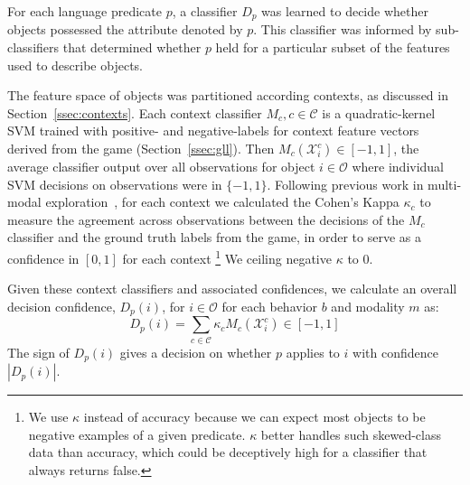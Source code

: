 For each language predicate $p$, a classifier $D_p$ was learned to decide whether objects possessed the attribute denoted by $p$.
This classifier was informed by sub-classifiers that determined whether $p$ held for a particular subset of the features used to describe objects.

The feature space of objects was partitioned according contexts, as discussed in Section~\ref{ssec:contexts}.
Each context classifier $M_{c}, c\in\mathcal{C}$ is a quadratic-kernel SVM trained with positive- and negative-labels for context feature vectors derived from the \ispy game (Section~\ref{ssec:gll}).
Then $M_{c}(\mathcal{X}_i^c)\in [-1,1]$, the average classifier output over all observations for object $i\in\mathcal{O}$ where individual SVM decisions on observations were in $\{-1,1\}$.
Following previous work in multi-modal exploration~\cite{sinapov:icra14}, for each context we calculated the Cohen's Kappa $\kappa_{c}$ to measure the agreement across observations between the decisions of the $M_{c}$ classifier and the ground truth labels from the \ispy game, in order to serve as a confidence in $[0,1]$ for each context
\footnote{We use $\kappa$ instead of accuracy because we can expect most objects to be negative examples of a given predicate. $\kappa$ better handles such skewed-class data than accuracy, which could be deceptively high for a classifier that always returns false.}
We ceiling negative $\kappa$ to $0$.

Given these context classifiers and associated confidences, we calculate an overall decision confidence, $D_p(i)$, for $i\in\mathcal{O}$ for each behavior $b$ and modality $m$ as:
\begin{equation}
	D_p(i) = \sum_{c\in\mathcal{C}}{\kappa_{c} M_{c}(\mathcal{X}_i^c)} \in [-1,1]
\end{equation}
The sign of $D_p(i)$ gives a decision on whether $p$ applies to $i$ with confidence $|D_p(i)|$.
